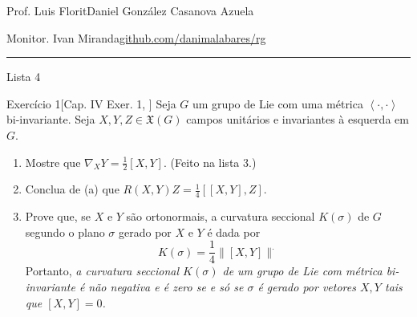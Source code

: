 \clearpage
\begin{minipage}{\textwidth}
	\begin{minipage}{1\textwidth}
		{\small Prof. Luis Florit\hfill Daniel González Casanova Azuela}
		
		{\small Monitor. Ivan Miranda\hfill\href{https://github.com/danimalabares/rg}{github.com/danimalabares/rg}}
	\end{minipage}
\end{minipage}\vspace{.2cm}\hrule

\vspace{10pt}
{\huge Lista 4}

\begin{thing4}{Exercício 1}[Cap. IV Exer. 1, \cite{doc}]\label{exer:1}\leavevmode
Seja \(G\) um grupo de Lie com uma métrica \(\left<\cdot,\cdot\right>\) bi-invariante. Seja \(X,Y,Z\in\mathfrak{X}(G) \) campos unitários e invariantes à esquerda em \(G\).
\begin{enumerate}[label=(\alph*)]
	\item Mostre que \(\nabla_XY=\frac{1}{2}[X,Y]\). (Feito na lista 3.)
	\item Conclua de (a) que \(R(X,Y)Z=\frac{1}{4}[[X,Y],Z]\).
	\item Prove que, se \(X\) e \(Y\) são ortonormais, a curvatura seccional \(K(\sigma)\) de \(G\) segundo o plano \(\sigma\) gerado por \(X\) e \(Y\) é dada por
		\[K(\sigma)=\frac{1}{4}\|[X,Y]\|^.\]
		Portanto, \textit{a curvatura seccional \(K(\sigma)\) de um grupo de Lie com métrica bi-invariante é não negativa e é zero se e só se \(\sigma\) é gerado por vetores \(X,Y\) tais que \([X,Y]=0\).} 
		
\end{enumerate}
\end{thing4}

